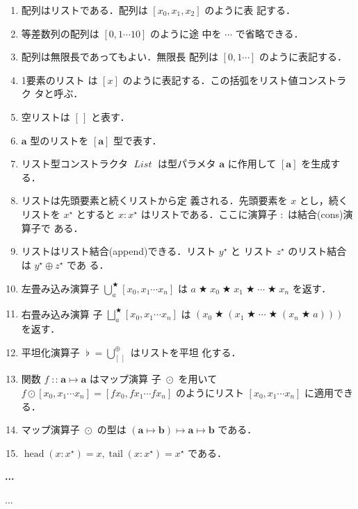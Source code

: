 \documentclass[a5paper,twoside,fleqn,draft]{jsbook}
\newenvironment{note}[1]{\begin{boxnote}\begin{center}\textbf{#1}\end{center}}{\end{boxnote}}
\newcommand{\mEmptyList}{{[\,]}}
\newcommand{\mSpecialFunc}[1]{\mathrm{#1}}
\DeclareMathOperator{\mHead}{\mSpecialFunc{head}}
\DeclareMathOperator{\mTail}{\mSpecialFunc{tail}}
\DeclareMathOperator{\mAppend}{\oplus}
\DeclareMathOperator{\mBinOp}{\bigstar}
\DeclareMathOperator{\mConcat}{\flat}
\DeclareMathOperator*{\mFold}{\bigcup}
\DeclareMathOperator*{\mFoldRight}{\bigsqcup}
\DeclareMathOperator{\mIn}{{:\!:}}
\DeclareMathOperator{\mMapList}{\odot}
\DeclareMathOperator{\mMapsTo}{\mapsto}
\newcommand{\mType}[1]{\mathbf{#1}}
\newcommand{\mListType}[1]{[\mType{#1}]}
\newcommand{\mTypeConstructor}[1]{\textit{#1}}
\DeclareMathOperator{\mListTypeConstructor}{\mTypeConstructor{List}}
\newcommand{\mListWith}[1]{\left[#1\right]}
\newcommand{\mList}[1]{{#1}^\mathrm{\star}}
\newcommand{\mProj}[2]{#1\mMapsTo#2}
\begin{document}
\begin{enumerate}
\item 配列はリストである．配列は $\mListWith{x_0,x_1,x_2}$ のように表
  記する．\item 等差数列の配列は $\mListWith{0,1\dotsb10}$ のように途
  中を $\dotsb$ で省略できる．\item 配列は無限長であってもよい．無限長
  配列は $\mListWith{0,1\dotsb}$ のように表記する．\item 1要素のリスト
  は $\mListWith{x}$ のように表記する．この括弧をリスト値コンストラク
  タと呼ぶ．\item 空リストは $\mEmptyList$ と表す．\item $\mType{a}$
  型のリストを $\mListType{a}$ 型で表す．\item リスト型コンストラクタ
  $\mListTypeConstructor$ は型パラメタ $\mType{a}$ に作用して
  $\mListType{a}$ を生成する．\item リストは先頭要素と続くリストから定
  義される．先頭要素を $x$ とし，続くリストを $\mList{x}$ とすると
  $x:\mList{x}$ はリストである．ここに演算子 $:$ は結合(cons)演算子で
  ある．\item リストはリスト結合(append)できる．リスト $\mList{y}$ と
  リスト $\mList{z}$ のリスト結合は $\mList{y}\mAppend\mList{z}$ であ
  る．\item 左畳み込み演算子
  $\mFold^{\mBinOp}_a\mListWith{x_0,x_1\dotsb x_n}$ は $a\mBinOp
  x_0\mBinOp x_1\mBinOp\dotsb\mBinOp x_n$ を返す．\item 右畳み込み演算
  子 $\mFoldRight^{\mBinOp}_{a}\mListWith{x_0,x_1\dotsb x_n}$ は
  $(x_0\mBinOp(x_1\mBinOp\dotsb\mBinOp(x_n\mBinOp a)))$ を返す．\item
  平坦化演算子 $\mConcat=\mFold_\mEmptyList^{\mAppend}$ はリストを平坦
  化する．\item 関数 $f\mIn\mProj{\mType{a}}{\mType{a}}$ はマップ演算
  子 $\mMapList$ を用いて $f\mMapList\mListWith{x_0,x_1\dotsb
    x_n}=\mListWith{fx_0,fx_1\dotsb fx_n}$ のようにリスト
  $\mListWith{x_0,x_1\dotsb x_n}$ に適用できる．\item マップ演算子
  $\mMapList$ の型は
  $\mProj{(\mProj{\mType{a}}{\mType{b}})}{\mProj{\mType{a}}{\mType{b}}}$
  である．\item $\mHead(x:\mList{x})=x,\mTail(x:\mList{x})=\mList{x}$
  である．
\end{enumerate}


\begin{note}{...}
...
\end{note}
\end{document}
